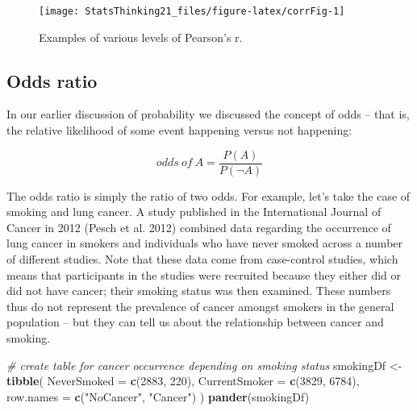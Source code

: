\documentclass[]{book}
\newenvironment{Shaded}{\begin{snugshade}}{\end{snugshade}}
\newcommand{\KeywordTok}[1]{\textcolor[rgb]{0.13,0.29,0.53}{\textbf{#1}}}
\newcommand{\DataTypeTok}[1]{\textcolor[rgb]{0.13,0.29,0.53}{#1}}
\newcommand{\DecValTok}[1]{\textcolor[rgb]{0.00,0.00,0.81}{#1}}
\newcommand{\StringTok}[1]{\textcolor[rgb]{0.31,0.60,0.02}{#1}}
\newcommand{\CommentTok}[1]{\textcolor[rgb]{0.56,0.35,0.01}{\textit{#1}}}
\newcommand{\NormalTok}[1]{#1}
\theoremstyle{definition}
\theoremstyle{definition}
\theoremstyle{definition}
\theoremstyle{remark}
\begin{document}
\begin{figure}
\texttt{[image: StatsThinking21\_files/figure-latex/corrFig-1]} \caption{Examples of various levels of Pearson's r.}\label{fig:corrFig}
\end{figure}

\subsection{Odds ratio}\label{odds-ratio}

In our earlier discussion of probability we discussed the concept of
odds -- that is, the relative likelihood of some event happening versus
not happening:

\[
odds\ of\ A = \frac{P(A)}{P(\neg A)}
\]

The odds ratio is simply the ratio of two odds. For example, let's take
the case of smoking and lung cancer. A study published in the
International Journal of Cancer in 2012 (Pesch et al. 2012) combined
data regarding the occurrence of lung cancer in smokers and individuals
who have never smoked across a number of different studies. Note that
these data come from case-control studies, which means that participants
in the studies were recruited because they either did or did not have
cancer; their smoking status was then examined. These numbers thus do
not represent the prevalence of cancer amongst smokers in the general
population -- but they can tell us about the relationship between cancer
and smoking.

\begin{Shaded}
\begin{Highlighting}[]
\CommentTok{# create table for cancer occurrence depending on smoking status}
\NormalTok{smokingDf <-}\StringTok{ }\KeywordTok{tibble}\NormalTok{(}
  \DataTypeTok{NeverSmoked =} \KeywordTok{c}\NormalTok{(}\DecValTok{2883}\NormalTok{, }\DecValTok{220}\NormalTok{),}
  \DataTypeTok{CurrentSmoker =} \KeywordTok{c}\NormalTok{(}\DecValTok{3829}\NormalTok{, }\DecValTok{6784}\NormalTok{),}
  \DataTypeTok{row.names =} \KeywordTok{c}\NormalTok{(}\StringTok{"NoCancer"}\NormalTok{, }\StringTok{"Cancer"}\NormalTok{)}
\NormalTok{)}
\KeywordTok{pander}\NormalTok{(smokingDf)}
\end{Highlighting}
\end{Shaded}
\end{document}
